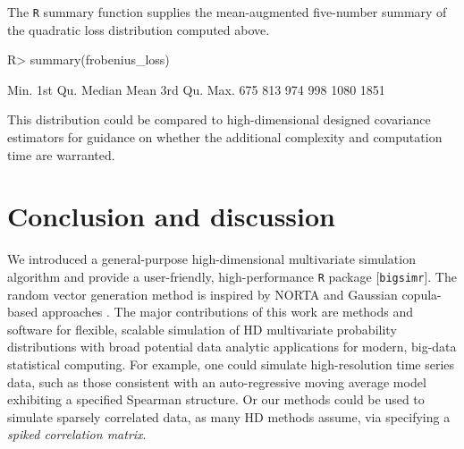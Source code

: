 \documentclass[
]{jss}
\begin{document}
\begin{CodeChunk}
\end{CodeChunk}

The \texttt{R} summary function supplies the mean-augmented five-number
summary of the quadratic loss distribution computed above.

\begin{CodeChunk}
\begin{CodeInput}
R> summary(frobenius_loss)
\end{CodeInput}
\begin{CodeOutput}
   Min. 1st Qu.  Median    Mean 3rd Qu.    Max. 
    675     813     974     998    1080    1851 
\end{CodeOutput}
\end{CodeChunk}

This distribution could be compared to high-dimensional designed
covariance estimators for guidance on whether the additional complexity
and computation time are warranted.

\hypertarget{discussion}{%
\section{Conclusion and discussion}\label{discussion}}

We introduced a general-purpose high-dimensional multivariate simulation
algorithm and provide a user-friendly, high-performance \texttt{R}
package {[}\texttt{bigsimr}{]}. The random vector generation method is
inspired by NORTA \citep{Cario1997} and Gaussian copula-based approaches
\citep[\citet{BF17}, \citet{Xia17}]{MB13}. The major contributions of
this work are methods and software for flexible, scalable simulation of
HD multivariate probability distributions with broad potential data
analytic applications for modern, big-data statistical computing. For
example, one could simulate high-resolution time series data, such as
those consistent with an auto-regressive moving average model exhibiting
a specified Spearman structure. Or our methods could be used to simulate
sparsely correlated data, as many HD methods assume, via specifying a
\emph{spiked correlation matrix}.
\end{document}
